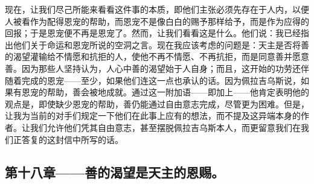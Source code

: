 现在，让我们尽己所能来看看这件事的本质，即他们主张必须先存在于人内，以便人被看作为配得恩宠的帮助，而恩宠不是像白白的赐予那样给予，而是作为应得的回报；于是恩宠便不再是恩宠了。然而，让我们看看这是什么。他们说：我已经指出他们关于命运和恩宠所说的空洞之言。现在我应该考虑的问题是：天主是否将善的渴望灌输给不情愿和抗拒的人，使他不再不情愿、不再抗拒，而是同意善并愿意善。因为那些人坚持认为，人心中善的渴望始于人自身；而且，这开始的功劳还伴随着完成的恩宠——至少，如果他们连这一点也承认的话。因为佩拉吉乌斯说，如果有恩宠的帮助，善会被地成就。通过这一附加语——即加上——他肯定表明他的观点是，即使缺少恩宠的帮助，善仍能通过自由意志完成，尽管更为困难。但是，让我为当前的对手们规定一下他们在此事上应有的想法，而不提及这异端本身的作者。让我们允许他们凭其自由意志，甚至摆脱佩拉吉乌斯本人，而更留意我们在我们正答复的这封信中所写的话。\par


\subsection{第十八章——善的渴望是天主的恩赐。}

